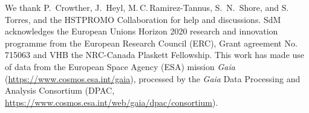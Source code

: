 \documentclass[a4paper,fleqn,usenatbib]{mnras}
\begin{document}
  
  
  {   \tiny
    We thank P.~Crowther, J.~Heyl, M.\,C.\,Ramirez-Tannus, S.~N.~Shore,
    and S.\,Torres, and the HSTPROMO Collaboration
    for help and discussions. SdM acknowledges
    the European Unions Horizon 2020 research and innovation programme
    from the European Research Council (ERC), Grant agreement No. 715063
    and VHB the NRC-Canada Plaskett Fellowship. This work has made use of data from the European Space Agency (ESA) mission {\it Gaia} (\url{https://www.cosmos.esa.int/gaia}), processed by the {\it Gaia} Data Processing and Analysis Consortium (DPAC, \url{https://www.cosmos.esa.int/web/gaia/dpac/consortium}).
  }
\end{document}
